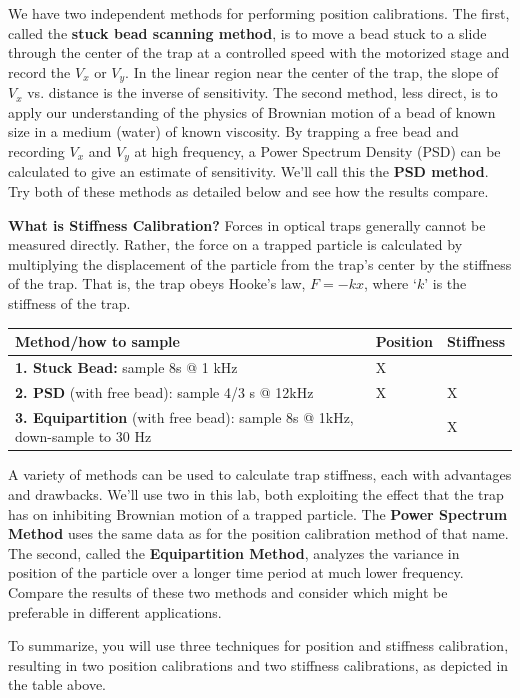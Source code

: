 \documentclass{../lab}
\begin{document}
We have two independent methods for performing position calibrations. The first, called the \textbf{stuck bead scanning method}, is to move a bead stuck to a slide through the center of the trap at a controlled speed with the motorized stage and record the $V_x$ or $V_y$. In the linear region near the center of the trap, the slope of $V_x$ vs. distance is the inverse of sensitivity. The second method, less direct, is to apply our understanding of the physics of Brownian motion of a bead of known size in a medium (water) of known viscosity. By trapping a free bead and recording $V_x$ and $V_y$ at high frequency, a Power Spectrum Density (PSD) can be calculated to give an estimate of sensitivity. We'll call this the \textbf{PSD method}. Try both of these methods as detailed below and see how the results compare.

\textbf{What is Stiffness Calibration?} Forces in optical traps generally cannot be measured directly. Rather, the force on a trapped particle is calculated by multiplying the displacement of the particle from the trap's center by the stiffness of the trap. That is, the trap obeys Hooke's law, $F = -k x$, where `$k$' is the stiffness of the trap.

\begin{center}
    \begin{tabular}{l|l|l}
        Method/how to sample & Position & Stiffness \\\hline
        \textbf{1. Stuck Bead:} sample 8s @ 1 kHz & X & \\\hline
        \textbf{2. PSD} (with free bead): sample 4/3 s @ 12kHz & X & X \\\hline
        \textbf{3. Equipartition} (with free bead): sample 8s @ 1kHz, down-sample to 30 Hz & & X
    \end{tabular}
\end{center}

A variety of methods can be used to calculate trap stiffness, each with advantages and drawbacks. We'll use two in this lab, both exploiting the effect that the trap has on inhibiting Brownian motion of a trapped particle. The \textbf{Power Spectrum Method} uses the same data as for the position calibration method of that name. The second, called the \textbf{Equipartition Method}, analyzes the variance in position of the particle over a longer time period at much lower frequency. Compare the results of these two methods and consider which might be preferable in different applications.

To summarize, you will use three techniques for position and stiffness calibration, resulting in two position calibrations and two stiffness calibrations, as depicted in the table above.
\end{document}

